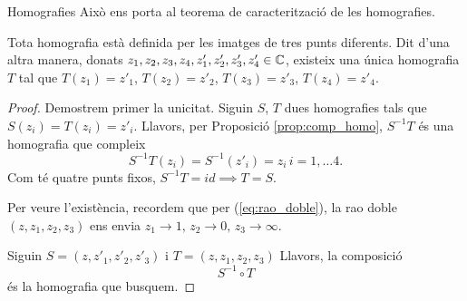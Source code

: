 \documentclass[dvipsnames, svgnames, leqno, a4paper, 12pt]{report}
\begin{document}
\begin{chapter}{Homografies}
    Això ens porta al teorema de caracterització de les homografies.

    \begin{theorem}
        Tota homografia està definida per les imatges de tres punts diferents.
        Dit d'una altra manera, donats $z_1,z_2,z_3,z_4,z'_1,z'_2,z'_3,z'_4\in\mathbb{C}$, existeix una única homografia $T$ tal que $T(z_1)=z'_1$, $T(z_2)=z'_2$, $T(z_3)=z'_3$, $T(z_4)=z'_4$.
    \end{theorem}

    \begin{proof}
        Demostrem primer la unicitat. Siguin $S$, $T$ dues homografies tals que $S(z_i)=T(z_i)=z'_i$. Llavors, per Proposició \ref{prop:comp_homo}, $S^{-1}T$ és una homografia que compleix 
        \begin{displaymath}
            S^{-1}T(z_i)=S^{-1}(z'_i)=z_i\, i=1,\dots4.
        \end{displaymath}
        Com té quatre punts fixos, $S^{-1}T=id\implies T=S$.

        Per veure l'existència, recordem que per (\ref{eq:rao_doble}), la rao doble $(z,z_1,z_2,z_3)$ ens envia $z_1\to1,\, z_2\to0,\, z_3\to\infty$. 

        Siguin $S=(z,z'_1,z'_2,z'_3)$ i $T=(z,z_1,z_2,z_3)$
        Llavors, la composició 
        \begin{displaymath}
            S^{-1}\circ T
        \end{displaymath}
        és la homografia que busquem.
    \end{proof}

\end{chapter}
\end{document}
